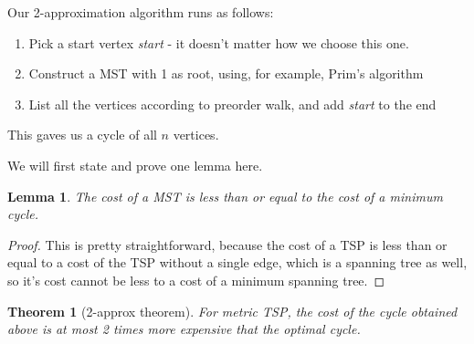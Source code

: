 \documentclass[12pt,twoside,notitlepage]{report}
\newtheorem{theorem}{Theorem}
\newtheorem{lemma}{Lemma}
\begin{document}
Our 2-approximation algorithm runs as follows: 

\begin{enumerate}

\item Pick a start vertex {\it start} - it doesn't matter how we choose this one.
\item Construct a MST with 1 as root, using, for example, Prim's algorithm
\item List all the vertices according to preorder walk, and add {\it start} to the end

\end{enumerate}

This gaves us a cycle of all $n$ vertices.

\smallskip

We will first state and prove one lemma here.

\begin{lemma}

\label{mstlemma}
The cost of a MST is less than or equal to the cost of a minimum cycle.

\end{lemma}

\begin{proof}

This is pretty straightforward, because the cost of a TSP is less than or equal to a cost of the TSP without a single edge, which is a spanning tree as well, so it's cost cannot be less to a cost of a minimum spanning tree.

\end{proof}

\begin{theorem}[2-approx theorem]

For metric TSP, the cost of the cycle obtained above is at most 2 times more expensive that the optimal cycle. \\

\end{theorem}
\end{document}
